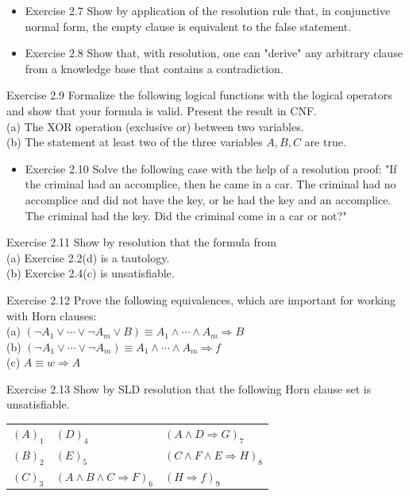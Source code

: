 \documentclass[10pt]{book}
\begin{document}
\begin{itemize}
  \item Exercise 2.7 Show by application of the resolution rule that, in conjunctive normal form, the empty clause is equivalent to the false statement.
  \item Exercise 2.8 Show that, with resolution, one can "derive" any arbitrary clause from a knowledge base that contains a contradiction.
\end{itemize}

Exercise 2.9 Formalize the following logical functions with the logical operators and show that your formula is valid. Present the result in CNF.\\
(a) The XOR operation (exclusive or) between two variables.\\
(b) The statement at least two of the three variables $A, B, C$ are true.

\begin{itemize}
  \item Exercise 2.10 Solve the following case with the help of a resolution proof: "If the criminal had an accomplice, then he came in a car. The criminal had no accomplice and did not have the key, or he had the key and an accomplice. The criminal had the key. Did the criminal come in a car or not?"
\end{itemize}

Exercise 2.11 Show by resolution that the formula from\\
(a) Exercise 2.2(d) is a tautology.\\
(b) Exercise 2.4(c) is unsatisfiable.

Exercise 2.12 Prove the following equivalences, which are important for working with Horn clauses:\\
(a) $\left(\neg A_{1} \vee \cdots \vee \neg A_{m} \vee B\right) \equiv A_{1} \wedge \cdots \wedge A_{m} \Rightarrow B$\\
(b) $\left(\neg A_{1} \vee \cdots \vee \neg A_{m}\right) \equiv A_{1} \wedge \cdots \wedge A_{m} \Rightarrow f$\\
(c) $A \equiv w \Rightarrow A$

Exercise 2.13 Show by SLD resolution that the following Horn clause set is unsatisfiable.

\begin{center}
\begin{tabular}{lll}
$(A)_{1}$ & $(D)_{4}$ & $(A \wedge D \Rightarrow G)_{7}$ \\
$(B)_{2}$ & $(E)_{5}$ & $(C \wedge F \wedge E \Rightarrow H)_{8}$ \\
$(C)_{3}$ & $(A \wedge B \wedge C \Rightarrow F)_{6}$ & $(H \Rightarrow f)_{9}$ \\
\end{tabular}
\end{center}
\end{document}
